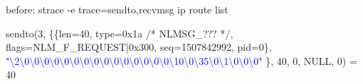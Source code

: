 \documentclass[unicode]{beamer}
\begin{document}
\begin{frame}[fragile]{\small before: strace -e trace=sendto,recvmsg ip route list}

{\texttt\tiny
\fontsize{6pt}{6pt}\selectfont
sendto(3, \{\{len=40, type=0x1a /* NLMSG\_??? */, flags=NLM\_F\_REQUEST|0x300, seq=1507842992, pid=0\}, \\
\textcolor{blue}{"\textbackslash{}2\textbackslash{}0\textbackslash{}0\textbackslash{}0\textbackslash{}0\textbackslash{}0\textbackslash{}0\textbackslash{}0\textbackslash{}0\textbackslash{}0\textbackslash{}0\textbackslash{}0\textbackslash{}0\textbackslash{}0\textbackslash{}0\textbackslash{}0\textbackslash{}10\textbackslash{}0\textbackslash{}35\textbackslash{}0\textbackslash{}1\textbackslash{}0\textbackslash{}0\textbackslash{}0"}
\}, 40, 0, NULL, 0) = 40

\medskip

}
\end{frame}
\end{document}
